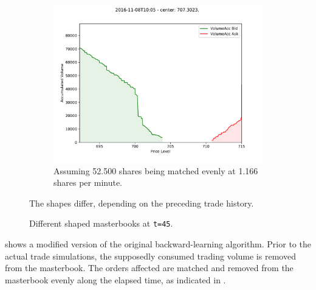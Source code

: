 \begin{figure}[ht]
\begin{subfigure}[t]{0.3\textwidth}
    	\end{subfigure}%
	\begin{subfigure}[t]{0.3\textwidth}
        		\centering
        		\includegraphics[width=\textwidth]{content/drawings/masterbook_customstart_SimEqual}
        		\caption{Assuming 52.500 shares being matched evenly at 1.166 shares per minute.}
		\label{fig:differingmasterbooks:SimEq}
    	\end{subfigure}%

	\caption{Different shaped masterbooks at \lstinline!t=45!.}
	The shapes differ, depending on the preceding trade history.
	\label{fig:differingmasterbooks}
\end{figure}

 shows a modified version of the original backward-learning algorithm. Prior to the actual trade simulations, the supposedly consumed trading volume is removed from the masterbook. The orders affected are matched and removed from the masterbook evenly along the elapsed time, as indicated in .\\

